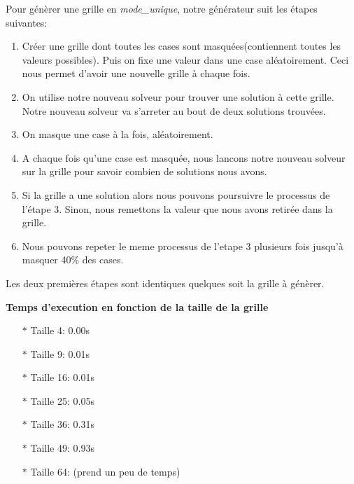 \documentclass{article}
\begin{document}
\begin{enumerate}
Pour génèrer une grille en \textit{mode\_unique}, notre générateur suit les étapes suivantes:
\vspace{0.2cm}
\begin{enumerate}
    \item Créer une grille dont toutes les cases sont masquées(contiennent toutes les valeurs possibles). Puis on fixe une valeur dans une case aléatoirement. Ceci nous permet d'avoir une nouvelle grille à chaque fois. \vspace{0.15cm}
    \item On utilise notre nouveau solveur pour trouver une solution à cette grille. Notre nouveau solveur va s'arreter au bout de deux solutions trouvées. \vspace{0.15cm}
    \item On masque une case à la fois, aléatoirement. \vspace{0.15cm}
    \item A chaque fois qu'une case est masquée, nous lancons notre nouveau solveur sur la grille pour savoir combien de solutions nous avons. \vspace{0.15cm}
    \item Si la grille a une solution alors nous pouvons poursuivre le processus de l'étape 3. Sinon, nous remettons la valeur que nous avons retirée dans la grille. \vspace{0.15cm}
    \item Nous pouvons repeter le meme processus de l'etape 3 plusieurs fois jusqu'à masquer 40\% des cases. \vspace{0.15cm}
    
\end{enumerate}

Les deux premières étapes sont identiques quelques soit la grille à génèrer. \vspace{0.15cm}

\textbf{Temps d'execution en fonction de la taille de la grille}
\vspace{0.2cm}

\begin{itemize}
    \item[$\ast$] Taille 4: 0.00s \vspace{0.12cm}
    \item[$\ast$] Taille 9: 0.01s \vspace{0.12cm}
    \item[$\ast$] Taille 16: 0.01s \vspace{0.12cm}
    \item[$\ast$] Taille 25: 0.05s \vspace{0.12cm}
    \item[$\ast$] Taille 36: 0.31s \vspace{0.12cm}
    \item[$\ast$] Taille 49: 0.93s \vspace{0.12cm}
    \item[$\ast$] Taille 64: (prend un peu de temps) \vspace{0.12cm}
\end{itemize}
\vspace{0.2cm}


\end{enumerate}
\end{document}
